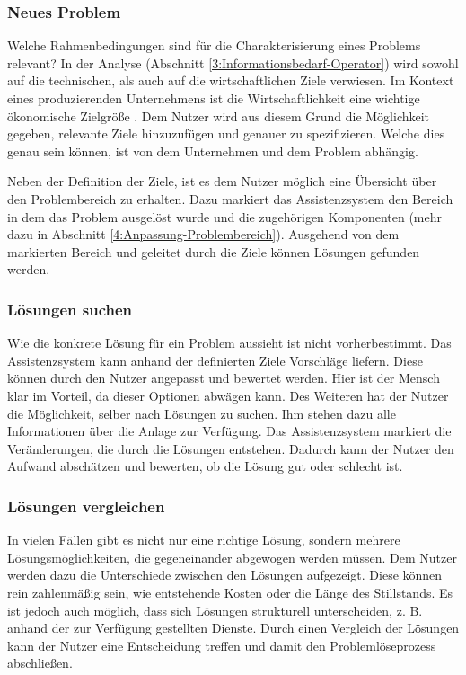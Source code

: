 \subsubsection*{Neues Problem}
Welche Rahmenbedingungen sind für die Charakterisierung eines Problems relevant? In der Analyse (Abschnitt \ref{3:Informationsbedarf-Operator}) wird sowohl auf die technischen, als auch auf die wirtschaftlichen Ziele verwiesen. Im Kontext eines produzierenden Unternehmens ist die Wirtschaftlichkeit eine wichtige ökonomische Zielgröße \cite{Bloech2014}. Dem Nutzer wird aus diesem Grund die Möglichkeit gegeben, relevante Ziele hinzuzufügen und genauer zu spezifizieren. Welche dies genau sein können, ist von dem Unternehmen und dem Problem abhängig.

Neben der Definition der Ziele, ist es dem Nutzer möglich eine Übersicht über den Problembereich zu erhalten. Dazu markiert das Assistenzsystem den Bereich in dem das Problem ausgelöst wurde und die zugehörigen Komponenten (mehr dazu in Abschnitt \ref{4:Anpassung-Problembereich}).
Ausgehend von dem markierten Bereich und geleitet durch die Ziele können Lösungen gefunden werden.

\subsubsection*{Lösungen suchen}
Wie die konkrete Lösung für ein Problem aussieht ist nicht vorherbestimmt. Das Assistenzsystem kann anhand der definierten Ziele Vorschläge liefern. Diese können durch den Nutzer angepasst und bewertet werden. Hier ist der Mensch klar im Vorteil, da dieser Optionen abwägen kann. Des Weiteren hat der Nutzer die Möglichkeit, selber nach Lösungen zu suchen. Ihm stehen dazu alle Informationen über die Anlage zur Verfügung. Das Assistenzsystem markiert die Veränderungen, die durch die Lösungen entstehen. Dadurch kann der Nutzer den Aufwand abschätzen und bewerten, ob die Lösung gut oder schlecht ist.

\subsubsection*{Lösungen vergleichen}
In vielen Fällen gibt es nicht nur eine richtige Lösung, sondern mehrere Lösungsmöglichkeiten, die gegeneinander abgewogen werden müssen. Dem Nutzer werden dazu die Unterschiede zwischen den Lösungen aufgezeigt. Diese können rein zahlenmäßig sein, wie entstehende Kosten oder die Länge des Stillstands. Es ist jedoch auch möglich, dass sich Lösungen strukturell unterscheiden, z. B. anhand der zur Verfügung gestellten Dienste. Durch einen Vergleich der Lösungen kann der Nutzer eine Entscheidung treffen und damit den Problemlöseprozess abschließen.

